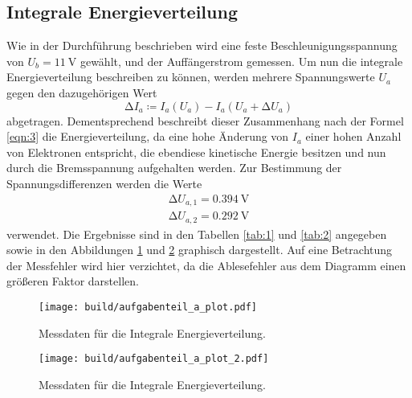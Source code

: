 \subsection{Integrale Energieverteilung}
\label{sec:ie}
Wie in der Durchführung beschrieben wird eine feste Beschleunigungsspannung von $U_b = \SI{11}{\volt}$ gewählt, und der Auffängerstrom gemessen.
Um nun die integrale Energieverteilung beschreiben zu können, werden mehrere Spannungswerte $U_a$ gegen den dazugehörigen Wert
\begin{equation}
  \increment I_a \coloneq I_a(U_a) - I_a(U_a + \increment U_a)
\end{equation}
abgetragen.
Dementsprechend beschreibt dieser Zusammenhang nach der Formel \eqref{eqn:3} die Energieverteilung, da eine hohe Änderung von $I_a$ einer hohen Anzahl von Elektronen entspricht, die ebendiese kinetische Energie besitzen und nun durch die Bremsspannung aufgehalten werden.
Zur Bestimmung der Spannungsdifferenzen werden die Werte
\begin{align*}
  \increment U_{a,1} = \SI{0,394}{\volt} \\
  \increment U_{a,2} = \SI{0.292}{\volt}
\end{align*}
verwendet.
Die Ergebnisse sind in den Tabellen \ref{tab:1} und \ref{tab:2} angegeben sowie in den Abbildungen \ref{fig:plot1} und \ref{fig:plot2} graphisch dargestellt.
Auf eine Betrachtung der Messfehler wird hier verzichtet, da die Ablesefehler aus dem Diagramm einen größeren Faktor darstellen.




\begin{figure}[H]
  \centering
  \texttt{[image: build/aufgabenteil\_a\_plot.pdf]}
  \caption{Messdaten für die Integrale Energieverteilung.}
  \label{fig:plot1}
\end{figure}

\begin{figure}[H]
  \centering
  \texttt{[image: build/aufgabenteil\_a\_plot\_2.pdf]}
  \caption{Messdaten für die Integrale Energieverteilung.}
  \label{fig:plot2}
\end{figure}

